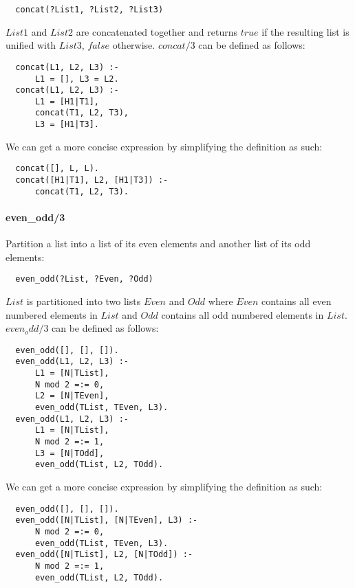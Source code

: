 \documentclass{article}
\begin{document}
\begin{multicols}{2}
  \begin{lstlisting}
  concat(?List1, ?List2, ?List3)
  \end{lstlisting} 
  
  $List1$ and $List2$ are concatenated together and returns $true$ if the resulting list is unified with $List3$, $false$ otherwise. $concat/3$ can be defined as follows:

  \begin{lstlisting}
  concat(L1, L2, L3) :-
      L1 = [], L3 = L2.
  concat(L1, L2, L3) :- 
      L1 = [H1|T1],
      concat(T1, L2, T3),
      L3 = [H1|T3].
  \end{lstlisting} 
  
  We can get a more concise expression by simplifying the definition as such:

  \begin{lstlisting}
  concat([], L, L).
  concat([H1|T1], L2, [H1|T3]) :- 
      concat(T1, L2, T3).
  \end{lstlisting}
  
  \paragraph{even\_odd/3} Partition a list into a list of its even elements and another list of its odd elements:
  
  \begin{lstlisting}
  even_odd(?List, ?Even, ?Odd)
  \end{lstlisting} 
  
  $List$ is partitioned into two lists $Even$ and $Odd$ where $Even$ contains all even numbered elements in $List$ and $Odd$ contains all odd numbered elements in $List$. $even_odd/3$ can be defined as follows:

  \begin{lstlisting}
  even_odd([], [], []).
  even_odd(L1, L2, L3) :- 
      L1 = [N|TList],
      N mod 2 =:= 0,
	  L2 = [N|TEven],
      even_odd(TList, TEven, L3).
  even_odd(L1, L2, L3) :- 
      L1 = [N|TList],
      N mod 2 =:= 1,
	  L3 = [N|TOdd],
      even_odd(TList, L2, TOdd).
  \end{lstlisting} 
  
  We can get a more concise expression by simplifying the definition as such:

  \begin{lstlisting}
  even_odd([], [], []).
  even_odd([N|TList], [N|TEven], L3) :- 
      N mod 2 =:= 0,
      even_odd(TList, TEven, L3).
  even_odd([N|TList], L2, [N|TOdd]) :- 
      N mod 2 =:= 1,
      even_odd(TList, L2, TOdd).
  \end{lstlisting} 
  

\end{multicols}
\end{document}
